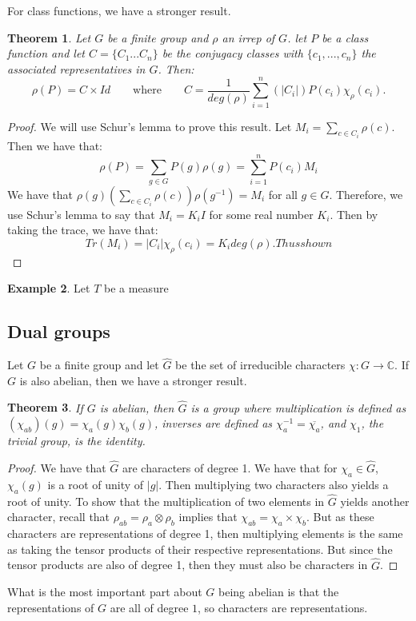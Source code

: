 \documentclass[]{article}
\newtheorem{theorem}{Theorem}
\theoremstyle{definition}
\newtheorem{example}[theorem]{Example}
\numberwithin{theorem}{section}
\numberwithin{equation}{section}
\begin{document}
For class functions, we have a stronger result.

\begin{theorem}
	Let $G$ be a finite group and $\rho$ an irrep of $G$. let $P$ be a class function and let $C = \lbrace C_1... C_n \rbrace$ be the conjugacy classes with $\lbrace c_1, ..., c_n \rbrace$ the associated representatives in $G$. Then:
	\begin{equation}
		\rho(P) = C \times Id \qquad \text{where} \qquad C = \frac{1}{deg(\rho)}  \sum_{i = 1}^n\left(|C_i|\right) P(c_i) \chi_\rho(c_i).
	\end{equation}
\end{theorem}
\begin{proof}
	We will use Schur's lemma to prove this result. 
	Let $M_i = \sum_{c \in C_i} \rho(c)$. Then we have that:
	\begin{equation}
		\rho(P) = \sum_{g \in G} P(g) \rho(g) = \sum_{i = 1}^n P(c_i) M_i
	\end{equation}
	We have that $\rho(g) \left(\sum_{c \in C_i} \rho(c)\right) \rho(g^{-1}) = M_i$ for all $g \in G$. Therefore, we use Schur's lemma to say that $M_i = K_i I$ for some real number $K_i$. Then by taking the trace, we have that:
	\begin{equation}
		Tr(M_i) = |C_i| \chi_\rho(c_i) = K_i deg(\rho). Thus shown
	\end{equation}
\end{proof}

\begin{example}
	Let $T$ be a measure 
\end{example}
\subsection{Dual groups}
Let $G$ be a finite group and let $\widehat{G}$ be the set of irreducible characters $\chi: G \rightarrow \mathbb{C}$. If $G$ is also abelian, then we have a stronger result. 
\begin{theorem}
	If $G$ is abelian, then $\widehat{G}$ is a group where multiplication is defined as $(\chi_{ab})(g) = \chi_a(g)\chi_b(g)$, inverses are defined as $\chi_a^{-1} = \overline{\chi_a}$, and $\chi_1$, the trivial group, is the identity. 
\end{theorem}
\begin{proof}
	We have that $\widehat{G}$ are characters of degree 1.
	 We have that for $\chi_a \in \widehat{G}$, $\chi_a(g)$ is a root of unity of $|g|$. Then multiplying two characters also yields a root of unity. To show that the multiplication of two elements in $\widehat{G}$ yields another character, recall that $\rho_{ab} = \rho_a \otimes \rho_b$ implies that $\chi_{ab} = \chi_a \times \chi_b$. But as these characters are representations of degree 1, then multiplying elements is the same as taking the tensor products of their respective representations. But since the tensor products are also of degree 1, then they must also be characters in $\widehat{G}$. 
\end{proof}
What is the most important part about $G$ being abelian is that the representations of $G$ are all of degree $1$, so characters are representations. 
\end{document}
